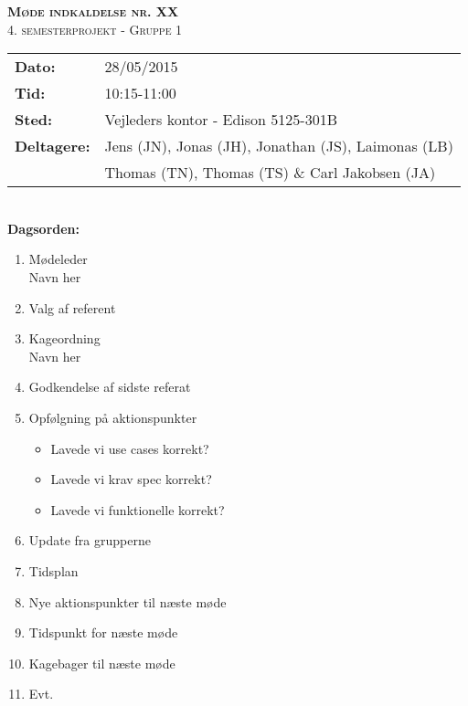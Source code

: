 
\newcommand{\HRule}{\rule{\linewidth}{0.1mm}}


	\begin{center}
		{\huge \bfseries \textsc{Møde indkaldelse nr. XX}}\\
		\textsc{\large 4. semesterprojekt - Gruppe 1}\\[0.3cm]
	\end{center}
	\begin{tabular}{ll}
	\large \textbf{Dato:} & 28/05/2015  \\ %
	\large \textbf{Tid:}  & 10:15-11:00 \\ %
	\large \textbf{Sted:} & Vejleders kontor - Edison 5125-301B		\\ %
	\large \textbf{Deltagere:} & Jens (JN), Jonas (JH), Jonathan (JS), Laimonas (LB) \\
	\large \textbf & Thomas (TN),  Thomas (TS) \& Carl Jakobsen (JA)\\
	\end{tabular}\\
	\phantom{\,}\hspace{0.1em} \large \textbf{Dagsorden:}
	\begin{enumerate}
		\itemsep 0.3em 
		\item Mødeleder\\
			Navn her
		\item Valg af referent
		\item Kageordning\\
			Navn her
		\item Godkendelse af sidste referat
		\item Opfølgning på aktionspunkter
		\begin{itemize}
			\itemsep 0.3em 
			\item Lavede vi use cases korrekt?
			\item Lavede vi krav spec korrekt?
			\item Lavede vi funktionelle korrekt?
		\end{itemize}
		\item Update fra grupperne
		\item Tidsplan
		\item Nye aktionspunkter til næste møde
		\item Tidspunkt for næste møde
		\item Kagebager til næste møde
		\item Evt.
	\end{enumerate}
